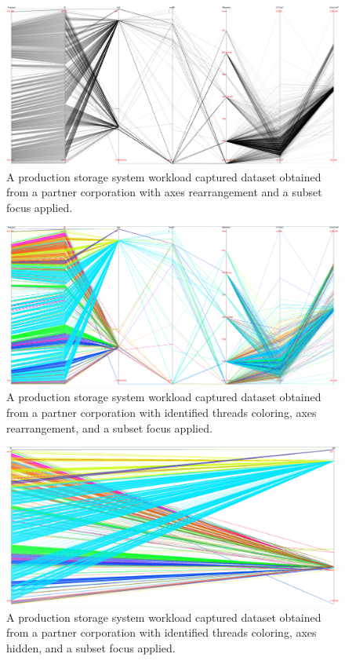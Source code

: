 \documentclass[12pt]{ucthesis}
\begin{document}
\begin{figure}[h!]
 \centering
 \includegraphics[width=\textwidth]{images/12.jpg}
 \caption[Focus applied on a production workload.]{A production storage system workload captured dataset obtained from a partner corporation with axes rearrangement and a subset focus applied.}
\end{figure}

\begin{figure}[h!]
 \centering
 \includegraphics[width=\textwidth]{images/13.jpg}
 \caption[Focus applied on a production workload with threads colored.]{A production storage system workload captured dataset obtained from a partner corporation with identified threads coloring, axes rearrangement, and a subset focus applied.}
\end{figure}

\begin{figure}[h!]
 \centering
 \includegraphics[width=\textwidth]{images/14.jpg}
 \caption[Focus applied on a production workload with threads colored.]{A production storage system workload captured dataset obtained from a partner corporation with identified threads coloring, axes hidden, and a subset focus applied.}
\end{figure}
\end{document}
